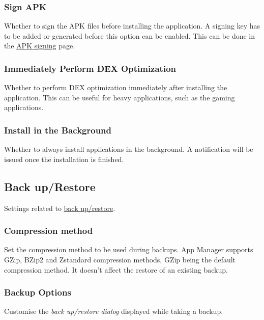 \subsubsection{Sign APK} %
Whether to sign the APK files before installing the application. A signing key has to be added or generated before this
option can be enabled. This can be done in the \hyperref[subsec:apk-signing]{APK signing} page.

\subsubsection{Immediately Perform DEX Optimization} %
Whether to perform DEX optimization immediately after installing the application. This can be useful
for heavy applications, such as the gaming applications.

\subsubsection{Install in the Background} %
Whether to always install applications in the background. A notification will be issued once the installation is finished.


\subsection{Back up/Restore}\label{subsec:backup/restore} %
Settings related to \hyperref[sec:backup-restore]{back up/restore}.

\subsubsection{Compression method} %
Set the compression method to be used during backups. App Manager supports GZip, BZip2 and Zstandard
compression methods, GZip being the default compression method. It doesn't affect the restore of
an existing backup.

\subsubsection{Backup Options}\label{subsubsec:settings-backup-options} %
Customise the \textit{back up/restore dialog} displayed while taking a backup.

